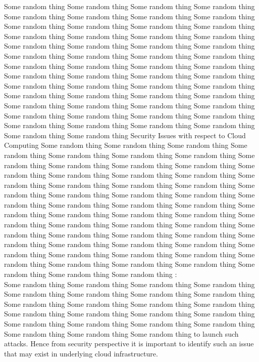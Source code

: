 Some random thing Some random thing Some random thing Some random thing Some random thing Some random thing Some random thing Some random thing Some random thing Some random thing Some random thing Some random thing Some random thing Some random thing Some random thing Some random thing Some random thing Some random thing Some random thing Some random thing Some random thing Some random thing Some random thing Some random thing Some random thing Some random thing Some random thing Some random thing Some random thing Some random thing Some random thing Some random thing Some random thing Some random thing Some random thing Some random thing Some random thing Some random thing Some random thing Some random thing Some random thing Some random thing Some random thing Some random thing Some random thing Some random thing Some random thing Some random thing Some random thing Some random thing Some random thing Some random thing Some random thing Some random thing 
Security Issues with respect to Cloud Computing \cite{fernandes2014security} Some random thing Some random thing Some random thing Some random thing Some random thing Some random thing Some random thing Some random thing Some random thing Some random thing Some random thing Some random thing Some random thing Some random thing Some random thing Some random thing Some random thing Some random thing Some random thing Some random thing Some random thing Some random thing Some random thing Some random thing Some random thing Some random thing Some random thing Some random thing Some random thing Some random thing Some random thing Some random thing Some random thing Some random thing Some random thing Some random thing Some random thing Some random thing Some random thing Some random thing Some random thing Some random thing Some random thing Some random thing Some random thing Some random thing Some random thing Some random thing Some random thing Some random thing Some random thing Some random thing Some random thing Some random thing  :\\
Some random thing Some random thing Some random thing Some random thing Some random thing Some random thing Some random thing Some random thing Some random thing Some random thing Some random thing Some random thing Some random thing Some random thing Some random thing Some random thing Some random thing Some random thing Some random thing Some random thing Some random thing Some random thing Some random thing  \cite{de2019cyber} to launch such attacks. Hence from security perspective it is important to identify such an issue that may exist in underlying cloud infrastructure.\\
